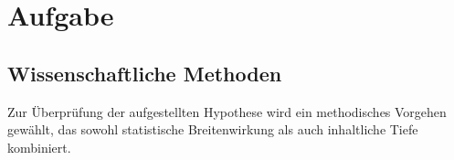 
\chapter{Aufgabe}
\label{chap:3 Aufgabe}
\thispagestyle{fancy}
\section{Wissenschaftliche Methoden} \par Zur Überprüfung der aufgestellten Hypothese wird ein methodisches Vorgehen gewählt, das sowohl statistische Breitenwirkung als auch inhaltliche Tiefe kombiniert.
